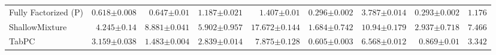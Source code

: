 \begin{tabular}{lrrrrrrr|r}
    Fully Factorized (P) & $0.618${\tiny${\pm 0.008}$} & $0.647${\tiny${\pm 0.01}$} & $1.187${\tiny${\pm 0.021}$} & $1.407${\tiny${\pm 0.01}$} & $0.296${\tiny${\pm 0.002}$} & $3.787${\tiny${\pm 0.014}$} & $0.293${\tiny${\pm 0.002}$} & $1.176$ \\
    ShallowMixture & $4.245${\tiny${\pm 0.14}$} & $8.881${\tiny${\pm 0.041}$} & $5.902${\tiny${\pm 0.957}$} & $17.672${\tiny${\pm 0.144}$} & $1.684${\tiny${\pm 0.742}$} & $10.94${\tiny${\pm 0.179}$} & $2.937${\tiny${\pm 0.718}$} & $7.466$ \\
    TabPC & $3.159${\tiny${\pm 0.038}$} & $1.483${\tiny${\pm 0.004}$} & $2.839${\tiny${\pm 0.014}$} & $7.875${\tiny${\pm 0.128}$} & $0.605${\tiny${\pm 0.003}$} & $6.568${\tiny${\pm 0.012}$} & $0.869${\tiny${\pm 0.01}$} & $3.342$ \\
    \bottomrule[1.0pt]
\end{tabular}